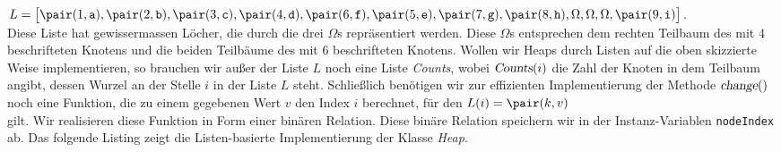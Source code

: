 \hspace*{1.3cm} $L = \bigl[ \pair(1,\mathtt{a}), \pair(2,\mathtt{b}),
\pair(3,\mathtt{c}), \pair(4,\mathtt{d}), \pair(6,\mathtt{f}), 
\pair(5,\mathtt{e}), \pair(7,\mathtt{g}), \pair(8,\mathtt{h}), \Omega, \Omega,
\Omega, \pair(9, \mathtt{i}) \bigr]$.
\\[0.1cm]
Diese Liste hat gewissermassen L\"ocher, die durch die drei $\Omega$s repr\"asentiert
werden. Diese $\Omega$s entsprechen dem rechten Teilbaum des mit $4$ beschrifteten Knotens
und die beiden Teilb\"aume des mit $6$ beschrifteten Knotens.
Wollen wir Heaps durch Listen auf die oben skizzierte Weise implementieren, so brauchen wir au{\ss}er der Liste $L$ noch
eine Liste \textsl{Counts}, wobei $\textsl{Counts}(i)$ die Zahl der Knoten in dem Teilbaum
angibt, dessen Wurzel an der Stelle $i$ in der Liste $L$ steht. 
Schlie{\ss}lich ben\"otigen wir zur effizienten Implementierung der Methode $\textsl{change}()$
noch eine Funktion, die zu einem gegebenen Wert $v$ den Index $i$ berechnet, f\"ur den 
 $L(i) = \pair(k,v)$ \\[0.1cm]
gilt.  Wir realisieren diese Funktion in Form einer bin\"aren Relation.  Diese bin\"are
Relation speichern wir in der Instanz-Variablen \texttt{nodeIndex} ab.
Das folgende Listing zeigt die Listen-basierte Implementierung der Klasse \textsl{Heap}.


